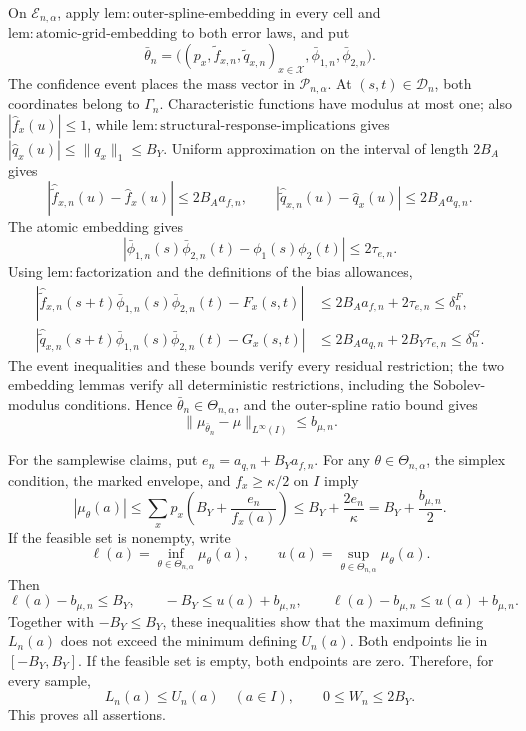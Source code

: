 On \(\mathcal E_{n,\alpha}\), apply \(\mathrm{lem{:}outer\text{-}spline\text{-}embedding}\) in every cell and \(\mathrm{lem{:}atomic\text{-}grid\text{-}embedding}\) to both error laws, and put
\[
 \bar\theta_n=
 \bigl((p_x,\widetilde f_{x,n},\widetilde q_{x,n})_{x\in\mathcal X},
       \bar\phi_{1,n},\bar\phi_{2,n}\bigr).
\]
The confidence event places the mass vector in \(\mathcal P_{n,\alpha}\).  At \((s,t)\in\mathcal D_n\), both coordinates belong to \(\Gamma_n\).  Characteristic functions have modulus at most one; also \(|\widehat f_x(u)|\le1\), while \(\mathrm{lem{:}structural\text{-}response\text{-}implications}\) gives \(|\widehat q_x(u)|\le\|q_x\|_1\le B_Y\).  Uniform approximation on the interval of length \(2B_A\) gives
\[
 |\widehat{\widetilde f}_{x,n}(u)-\widehat f_x(u)|\le2B_Aa_{f,n},
 \qquad
 |\widehat{\widetilde q}_{x,n}(u)-\widehat q_x(u)|\le2B_Aa_{q,n}.
\]
The atomic embedding gives
\[
 |\bar\phi_{1,n}(s)\bar\phi_{2,n}(t)-\phi_1(s)\phi_2(t)|
 \le2\tau_{e,n}.
\]
Using \(\mathrm{lem{:}factorization}\) and the definitions of the bias allowances,
\[
 \begin{aligned}
 |\widehat{\widetilde f}_{x,n}(s+t)
   \bar\phi_{1,n}(s)\bar\phi_{2,n}(t)-F_x(s,t)|
 &\le2B_Aa_{f,n}+2\tau_{e,n}\le\delta^F_n,\\
 |\widehat{\widetilde q}_{x,n}(s+t)
   \bar\phi_{1,n}(s)\bar\phi_{2,n}(t)-G_x(s,t)|
 &\le2B_Aa_{q,n}+2B_Y\tau_{e,n}\le\delta^G_n.
 \end{aligned}
\]
The event inequalities and these bounds verify every residual restriction; the two embedding lemmas verify all deterministic restrictions, including the Sobolev-modulus conditions.  Hence \(\bar\theta_n\in\Theta_{n,\alpha}\), and the outer-spline ratio bound gives
\[
 \|\mu_{\bar\theta_n}-\mu\|_{L^\infty(I)}\le b_{\mu,n}.
\]

For the samplewise claims, put \(e_n=a_{q,n}+B_Ya_{f,n}\).  For any \(\theta\in\Theta_{n,\alpha}\), the simplex condition, the marked envelope, and \(f_x\ge\kappa/2\) on \(I\) imply
\[
 |\mu_\theta(a)|
 \le\sum_xp_x\left(B_Y+\frac{e_n}{f_x(a)}\right)
 \le B_Y+\frac{2e_n}{\kappa}
 =B_Y+\frac{b_{\mu,n}}2.
\]
If the feasible set is nonempty, write
\[
 \ell(a)=\inf_{\theta\in\Theta_{n,\alpha}}\mu_\theta(a),
 \qquad
 u(a)=\sup_{\theta\in\Theta_{n,\alpha}}\mu_\theta(a).
\]
Then
\[
 \ell(a)-b_{\mu,n}\le B_Y,
 \qquad
 -B_Y\le u(a)+b_{\mu,n},
 \qquad
 \ell(a)-b_{\mu,n}\le u(a)+b_{\mu,n}.
\]
Together with \(-B_Y\le B_Y\), these inequalities show that the maximum defining \(L_n(a)\) does not exceed the minimum defining \(U_n(a)\).  Both endpoints lie in \([-B_Y,B_Y]\).  If the feasible set is empty, both endpoints are zero.  Therefore, for every sample,
\[
 L_n(a)\le U_n(a)\quad(a\in I),
 \qquad 0\le W_n\le2B_Y.
\]
This proves all assertions.


